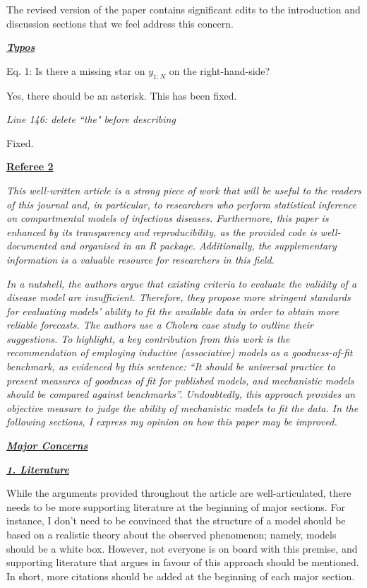 \documentclass[11pt]{article}
\newcommand\report[1]{{\color{mygreen} \vspace{1mm}\hspace{0.25in}\parbox{6in}{\em #1}}}
\begin{document}
The revised version of the paper contains significant edits to the introduction and discussion sections that we feel address this concern. 

\report{
  \textbf{\underline{Typos}}

  Eq. 1: Is there a missing star on $y_{1:N}$ on the right-hand-side?
}

Yes, there should be an asterisk. This has been fixed.

\report{
  Line 146: delete ``the" before describing
}

Fixed.

\newpage


\begin{center}
{\large{\textbf{\underline{Referee 2}}}} %
\end{center}


\report{
  This well-written article is a strong piece of work that will be useful to the readers of this journal and, in particular, to researchers who perform statistical inference on compartmental models of infectious diseases. Furthermore, this paper is enhanced by its transparency and reproducibility, as the provided code is well-documented and organised in an R package. Additionally, the supplementary information is a valuable resource for researchers in this field.
}

\report{
  In a nutshell, the authors argue that existing criteria to evaluate the validity of a disease model are insufficient. Therefore, they propose more stringent standards for evaluating models’ ability to fit the available data in order to obtain more reliable forecasts. The authors use a Cholera case study to outline their suggestions. To highlight, a key contribution from this work is the recommendation of employing inductive (associative) models as a goodness-of-fit benchmark, as evidenced by this sentence: “It should be universal practice to present measures of goodness of fit for published models, and mechanistic models should be compared against benchmarks”. Undoubtedly, this approach provides an objective measure to judge the ability of mechanistic models to fit the data. In the following sections, I express my opinion on how this paper may be improved.
}

\report{
\textbf{\underline{Major Concerns}}
}

\report{
  \textbf{\underline{1. Literature}}

While the arguments provided throughout the article are well-articulated, there needs to be more supporting literature at the beginning of major sections. For instance, I don’t need to be convinced that the structure of a model should be based on a realistic theory about the observed phenomenon; namely, models should be a white box. However, not everyone is on board with this premise, and supporting literature that argues in favour of this approach should be mentioned. In short, more citations should be added at the beginning of each major section.
}
\end{document}
